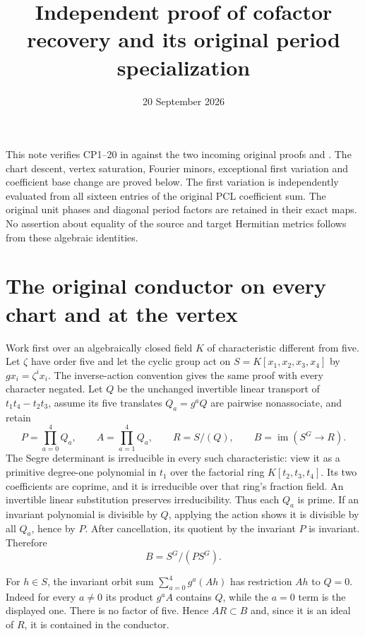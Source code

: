 \documentclass[11pt]{article}
\title{Independent proof of cofactor recovery and its original period specialization}
\author{}
\date{20 September 2026}
\newcommand{\im}{\operatorname{im}}
\begin{document}
\maketitle

This note verifies CP1--20 in
 against the two
incoming original proofs 
and . The chart descent,
vertex saturation, Fourier minors, exceptional first variation and
coefficient base change are proved below.  The first variation is
independently evaluated from all sixteen entries of the original PCL
coefficient sum.  The original unit phases and diagonal period factors
are retained in their exact maps.  No assertion about equality of
the source and target Hermitian metrics follows from these algebraic
identities.

\section{The original conductor on every chart and at the vertex}
Work first over an algebraically closed field $K$ of characteristic
different from five.  Let $\zeta$ have order five and let the cyclic
group act on $S=K[x_1,x_2,x_3,x_4]$ by $g x_i=\zeta^i x_i$.
The inverse-action convention gives the same proof with every character
negated.  Let $Q$ be the unchanged invertible linear transport of
$t_1t_4-t_2t_3$, assume its five translates $Q_a=g^aQ$ are pairwise
nonassociate, and retain
\[
 P=\prod_{a=0}^4Q_a,\qquad A=\prod_{a=1}^4Q_a,\qquad
 R=S/(Q),\qquad B=\im(S^G\to R).                              \tag{CR1}
\]
The Segre determinant is irreducible in every such characteristic:
view it as a primitive degree-one polynomial in $t_1$ over the
factorial ring $K[t_2,t_3,t_4]$.  Its two coefficients are coprime,
and it is irreducible over that ring's fraction field.  An invertible
linear substitution preserves irreducibility.  Thus each $Q_a$ is
prime.  If an invariant polynomial is divisible by $Q$, applying
the action shows it is divisible by all $Q_a$, hence by $P$.
After cancellation, its quotient by the invariant $P$ is invariant.
Therefore
\[
 B=S^G/(P S^G).                                                \tag{CR2}
\]

For $h\in S$, the invariant orbit sum $\sum_{a=0}^4g^a(Ah)$ has
restriction $Ah$ to $Q=0$.  Indeed for every $a\ne0$ its product
$g^aA$ contains $Q$, while the $a=0$ term is the displayed one.
There is no factor of five.  Hence $AR\subset B$ and, since it
is an ideal of $R$, it is contained in the conductor.
\end{document}
